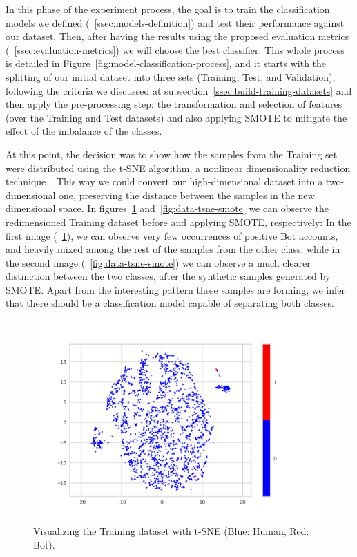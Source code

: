 \documentclass[a4paper, 12pt]{book}
\begin{document}
In this phase of the experiment process, the goal is to train the classification models we defined (~\ref{ssec:models-definition}) and test their performance against our dataset. Then, after having the results using the proposed evaluation metrics (~\ref{ssec:evaluation-metrics}) we will choose the best classifier. This whole process is detailed in Figure~\ref{fig:model-classification-process}, and it starts with the splitting of our initial dataset into three sets (Training, Test, and Validation), following the criteria we discussed at subsection~\ref{ssec:build-training-datasets} and then apply the pre-processing step: the transformation and selection of features (over the Training and Test datasets) and also applying SMOTE to mitigate the effect of the imbalance of the classes.

At this point, the decision was to show how the samples from the Training set were distributed using the t-SNE algorithm, a nonlinear dimensionality reduction technique~\cite{vandermaaten-et-at:t-sne08}. This way we could convert our high-dimensional dataset into a two-dimensional one, preserving the distance between the samples in the new dimensional space. In figures~\ref{fig:data-tsne} and~\ref{fig:data-tsne-smote} we can observe the redimensioned Training dataset before and applying SMOTE, respectively: In the first image (~\ref{fig:data-tsne}), we can observe very few occurrences of positive Bot accounts, and heavily mixed among the rest of the samples from the other class; while in the second image (~\ref{fig:data-tsne-smote}) we can observe a much clearer distinction between the two classes, after the synthetic samples generated by SMOTE. Apart from the interesting pattern these samples are forming, we infer that there should be a classification model capable of separating both classes.

\begin{figure}
 \centering
  \includegraphics[width=15cm, keepaspectratio]{img/data-tsne.png}
  \caption{Visualizing the Training dataset with t-SNE (Blue: Human, Red: Bot).}
  \label{fig:data-tsne}
\end{figure}
\end{document}
